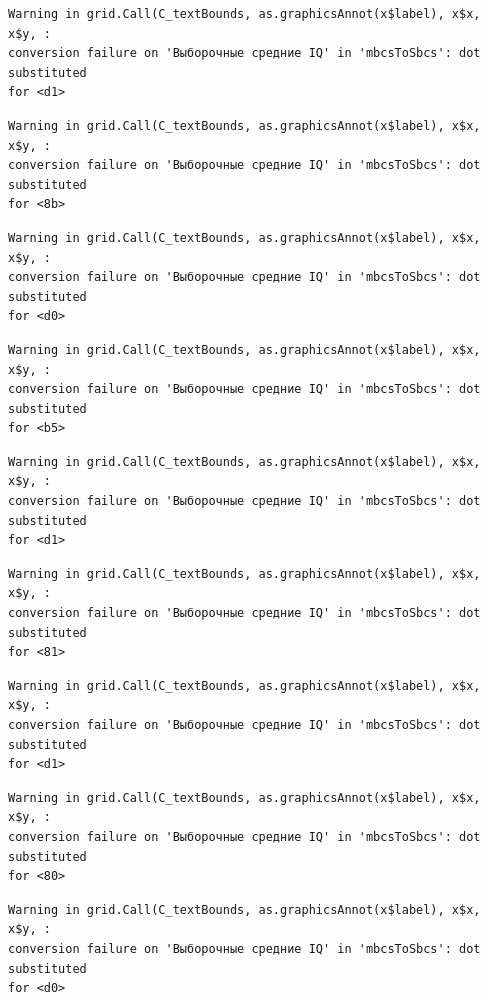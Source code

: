\documentclass[
  letterpaper,
]{scrbook}
\theoremstyle{definition}
\theoremstyle{remark}
\begin{document}
\begin{verbatim}
Warning in grid.Call(C_textBounds, as.graphicsAnnot(x$label), x$x, x$y, :
conversion failure on 'Выборочные средние IQ' in 'mbcsToSbcs': dot substituted
for <d1>
\end{verbatim}

\begin{verbatim}
Warning in grid.Call(C_textBounds, as.graphicsAnnot(x$label), x$x, x$y, :
conversion failure on 'Выборочные средние IQ' in 'mbcsToSbcs': dot substituted
for <8b>
\end{verbatim}

\begin{verbatim}
Warning in grid.Call(C_textBounds, as.graphicsAnnot(x$label), x$x, x$y, :
conversion failure on 'Выборочные средние IQ' in 'mbcsToSbcs': dot substituted
for <d0>
\end{verbatim}

\begin{verbatim}
Warning in grid.Call(C_textBounds, as.graphicsAnnot(x$label), x$x, x$y, :
conversion failure on 'Выборочные средние IQ' in 'mbcsToSbcs': dot substituted
for <b5>
\end{verbatim}

\begin{verbatim}
Warning in grid.Call(C_textBounds, as.graphicsAnnot(x$label), x$x, x$y, :
conversion failure on 'Выборочные средние IQ' in 'mbcsToSbcs': dot substituted
for <d1>
\end{verbatim}

\begin{verbatim}
Warning in grid.Call(C_textBounds, as.graphicsAnnot(x$label), x$x, x$y, :
conversion failure on 'Выборочные средние IQ' in 'mbcsToSbcs': dot substituted
for <81>
\end{verbatim}

\begin{verbatim}
Warning in grid.Call(C_textBounds, as.graphicsAnnot(x$label), x$x, x$y, :
conversion failure on 'Выборочные средние IQ' in 'mbcsToSbcs': dot substituted
for <d1>
\end{verbatim}

\begin{verbatim}
Warning in grid.Call(C_textBounds, as.graphicsAnnot(x$label), x$x, x$y, :
conversion failure on 'Выборочные средние IQ' in 'mbcsToSbcs': dot substituted
for <80>
\end{verbatim}

\begin{verbatim}
Warning in grid.Call(C_textBounds, as.graphicsAnnot(x$label), x$x, x$y, :
conversion failure on 'Выборочные средние IQ' in 'mbcsToSbcs': dot substituted
for <d0>
\end{verbatim}
\end{document}
